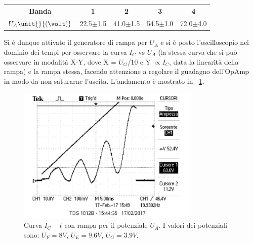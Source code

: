 \documentclass[10pt,a4paper]{article}
\begin{document}
\begin{table}[h!]
\centering
\begin{tabular}{c|c|c|c|c}
\hline
Banda &1&2&3&4\\
\hline 
$U_{A} \unit{}{(\volt)}$ & 22.5$\pm$1.5 & 41.0$\pm$1.5 & 54.5$\pm$1.0 & 72.0$\pm$4.0  \\ 
\hline
\end{tabular}
\label{tab:massimi}
\end{table}




Si è dunque attivato il generatore di rampa per $U_{A}$ e si è posto l'oscilloscopio nel dominio dei tempi per osservare la curva $I_{C}$ vs $U_{A}$ (la stessa curva che si può osservare in modalità X-Y, dove X = $U_{G}$/10 e Y $\propto I_{C}$, data la linearità della rampa) e la rampa stessa, facendo attenzione a regolare il guadagno dell'OpAmp in modo da non saturarne l'uscita. L'andamento è mostrato in \figurename{~\ref{andamento}}.

\begin{figure}[h!]
	\centering
		\includegraphics[width=0.80\textwidth]{../oscilloscopio/CorrenteAnodicaTempo1.png}
	\caption{Curva $I_{C} - t$ con rampa per il potenziale $U_{A}$. I valori dei potenziali sono: $U_{F}=\unit{8}{V}$, $U_{E}=\unit{9.6}{V}$, $U_{G}=\unit{3.9}{V}$.}
	\label{andamento}
\end{figure}
\end{document}
